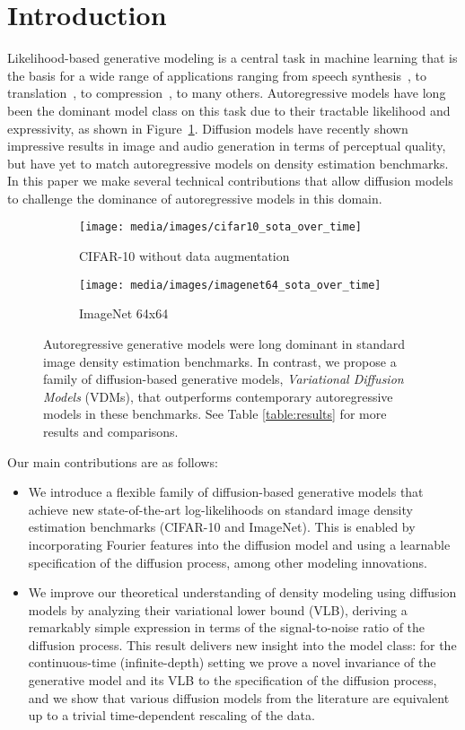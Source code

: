 \documentclass{article}
\begin{document}
\section{Introduction}
Likelihood-based generative modeling is a central task in machine learning that is the basis for a wide range of applications ranging from speech synthesis~\citep{oord2016wavenet}, to translation~\citep{sutskever2014sequence}, to compression~\citep{mackay2003information}, to many others. Autoregressive models have long been the dominant model class on this task due to their tractable likelihood and expressivity, as shown in Figure~\ref{fig:sota}. Diffusion models have recently shown impressive results in image \citep{ho2020denoising, song2020score,nichol2021improved} and audio generation \citep{kong2020diffwave, chen2020wavegrad} in terms of perceptual quality, but have yet to match autoregressive models on density estimation benchmarks. In this paper we make several technical contributions that allow diffusion models to challenge the dominance of autoregressive models in this domain.
\begin{figure}[bht]
\begin{subfigure}{.485\textwidth}
  \centering
\texttt{[image: media/images/cifar10\_sota\_over\_time]}
  \caption{CIFAR-10 without data augmentation}
\end{subfigure}
\begin{subfigure}{.495\textwidth}
  \centering
\texttt{[image: media/images/imagenet64\_sota\_over\_time]}  
  \caption{ImageNet 64x64}
\end{subfigure}
\caption{Autoregressive generative models were long dominant in standard image density estimation benchmarks. In contrast, we propose a family of diffusion-based generative models, \emph{Variational Diffusion Models} (VDMs), that outperforms contemporary autoregressive models in these benchmarks. See Table \ref{table:results} for more results and comparisons.}
\label{fig:sota}
\end{figure}
Our main contributions are as follows:
\begin{itemize}
\item We introduce a flexible family of diffusion-based generative models that achieve new state-of-the-art log-likelihoods on standard image density estimation benchmarks (CIFAR-10 and ImageNet). This is enabled by incorporating Fourier features into the diffusion model and using a learnable specification of the diffusion process, among other modeling innovations.
\item We improve our theoretical understanding of density modeling using diffusion models by analyzing their variational lower bound (VLB), deriving a remarkably simple expression in terms of the signal-to-noise ratio of the diffusion process. This result delivers new insight into the model class: for the continuous-time (infinite-depth) setting we prove a novel invariance of the generative model and its VLB to the specification of the diffusion process, and we show that various diffusion models from the literature are equivalent up to a trivial time-dependent rescaling of the data.
\end{itemize}
\end{document}
